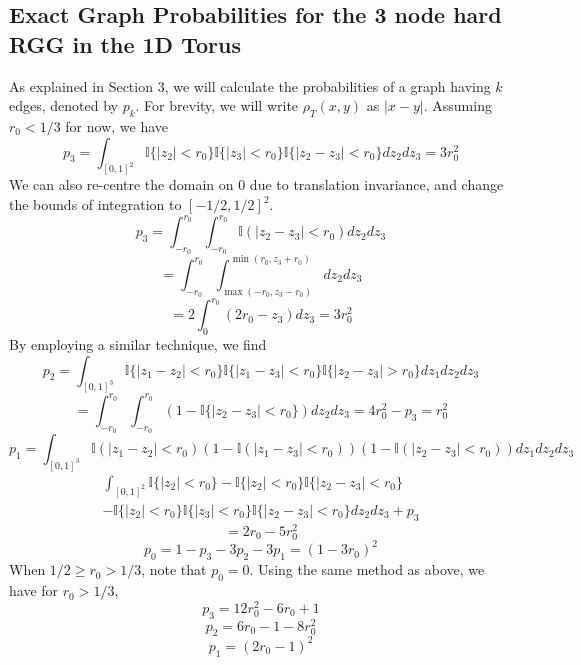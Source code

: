 \documentclass{article}
\begin{document}
\subsection{Exact Graph Probabilities for the 3 node hard RGG in the 1D Torus}
As explained in Section 3, we will calculate the probabilities of a graph having $k$ edges, denoted by $p_k$. For brevity, we will write $\rho_T(x,y)$ as $|x-y|$. Assuming $r_0 < 1/3$ for now, we have
\begin{equation}
    p_3 = \int_{[0,1]^2} \mathbb{I}\{|z_2| <r_0\}\mathbb{I}\{|z_3|<r_0\}\mathbb{I}\{|z_2-z_3|<r_0\}dz_2dz_3 = 3r_0^2
\end{equation}
We can also re-centre the domain on 0 due to translation invariance, and change the bounds of integration to $[-1/2,1/2]^2$.
\begin{equation}
    p_3 = \int_{-r_0}^{r_0}\int_{-r_0}^{r_0}\mathbb{I}(|z_2-z_3| < r_0) dz_2dz_3
\end{equation}
\begin{equation}
    = \int_{-r_0}^{r_0} \int_{\max(-r_0, z_3-r_0)}^{\min(r_0, z_3+r_0)}dz_2dz_3
\end{equation}
\begin{equation}
    =2\int_0^{r_0} (2r_0 - z_3) dz_3 = 3r_0^2
\end{equation}
By employing a similar technique, we find
\begin{equation*}
    p_2 = \int_{[0,1]^3} \mathbb{I}\{|z_1-z_2|<r_0\}\mathbb{I}\{|z_1-z_3|<r_0\}\mathbb{I}\{|z_2-z_3|>r_0\}dz_1dz_2dz_3
\end{equation*}
\begin{equation}
    = \int_{-r_0}^{r_0}\int_{-r_0}^{r_0} (1-\mathbb{I}\{|z_2-z_3|<r_0\}) dz_2dz_3 = 4r_0^2 - p_3 = r_0^2
\end{equation}
\begin{equation}
    p_1 = \int_{[0,1]^3} \mathbb{I}(|z_1-z_2| < r_0)(1-\mathbb{I}(|z_1-z_3|<r_0))(1-\mathbb{I}(|z_2-z_3|<r_0))dz_1dz_2dz_3
\end{equation}
\begin{gather}
    \int_{[0,1]^2} \mathbb{I}\{|z_2|<r_0\} - \mathbb{I}\{|z_2|<r_0\}\mathbb{I}\{|z_2-z_3|<r_0\} \nonumber \\
    - \mathbb{I}\{|z_2|<r_0\}\mathbb{I}\{|z_3|<r_0\}\mathbb{I}\{|z_2-z_3|<r_0\}dz_2dz_3 + p_3
\end{gather}
\begin{equation}
    = 2r_0 - 5r_0^2
\end{equation}
\begin{equation}
    p_0 = 1 - p_3 - 3p_2 - 3p_1 = (1-3r_0)^2
\end{equation}
When $1/2 \geq r_0 > 1/3$, note that $p_0 = 0$. Using the same method as above, we have for $r_0 > 1/3$,
\begin{equation*}
    p_3 = 12r_0^2-6r_0+1
\end{equation*}
\begin{equation*}
    p_2 = 6r_0 - 1 - 8r_0^2
\end{equation*}
\begin{equation}
    p_1 = (2r_0-1)^2
\end{equation}
\end{document}
